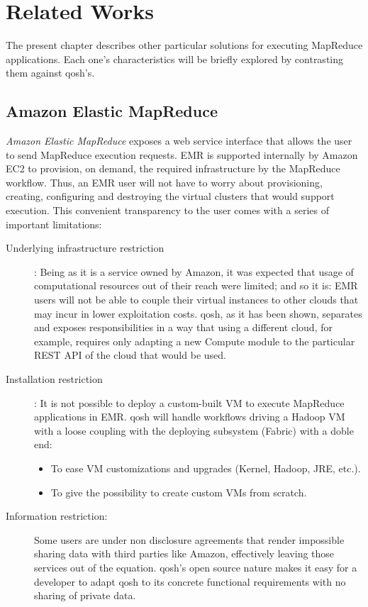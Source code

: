 \chapter{Related Works}\label{cap:conclusiones}
\noindent The present chapter describes other particular solutions for executing MapReduce applications. Each one's characteristics will be briefly explored by contrasting them against qosh's.

\section{Amazon Elastic MapReduce}\label{sec:emc}
\noindent \emph{Amazon Elastic MapReduce} \cite{aws} exposes a web service interface that allows the user to send MapReduce execution requests. EMR is supported internally by Amazon EC2 to provision, on demand, the required infrastructure by the MapReduce workflow. Thus, an EMR user will not have to worry about provisioning, creating, configuring and destroying the virtual clusters that would support execution. This convenient transparency to the user comes with a series of important limitations:

\begin{description}
    \item[Underlying infrastructure restriction]: Being as it is a service owned by Amazon, it was expected that usage of computational resources out of their reach were limited; and so it is: EMR users will not be able to couple their virtual instances to other clouds that may incur in lower exploitation costs.
    qosh, as it has been shown, separates and exposes responsibilities in a way that using a different cloud, for example, requires only adapting a new Compute module to the particular REST API of the cloud that would be used.
    \item[Installation restriction]: It is not possible to deploy a custom-built VM to execute MapReduce applications in EMR. qosh will handle workflows driving a Hadoop VM with a loose coupling with the deploying subsystem (Fabric) with a doble end:
    \begin{itemize}
        \item To ease VM customizations and upgrades (Kernel, Hadoop, JRE, etc.).
        \item To give the possibility to create custom VMs from scratch.
    \end{itemize}
    \item[Information restriction:] Some users are under non disclosure agreements that render impossible sharing data with third parties like Amazon, effectively leaving those services out of the equation. qosh's open source nature makes it easy for a developer to adapt qosh to its concrete functional requirements with no sharing of private data.
\end{description}

